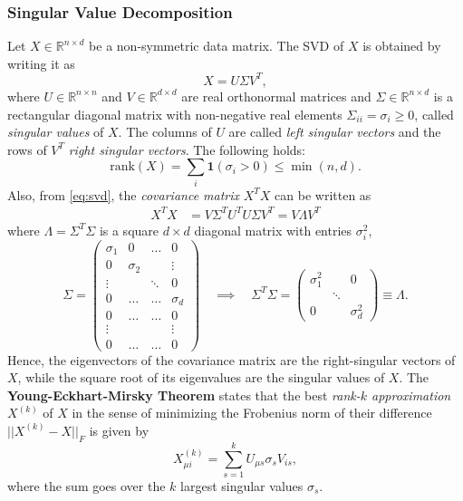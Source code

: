 \documentclass{article}
\begin{document}
\subsubsection*{Singular Value Decomposition}
Let $X \in \mathbb{R}^{n\times d}$ be a non-symmetric data matrix. The SVD of $X$ is obtained by writing it as
\begin{equation}
    X = U\Sigma V^T,
    \label{eq:svd}
\end{equation}
where $U\in \mathbb{R}^{n\times n}$ and $V\in \mathbb{R}^{d\times d}$ are real orthonormal matrices and $\Sigma \in \mathbb{R}^{n\times d}$ is a rectangular diagonal matrix with non-negative real elements $\Sigma_{ii} = \sigma_i \geq 0$, called \emph{singular values} of $X$. The columns of $U$ are called \emph{left singular vectors} and the rows of $V^T$ \emph{right singular vectors}. The following holds:
\begin{equation}
    \text{rank}(X) = \sum_{i} \mathbf{1}(\sigma_i > 0)
    \leq \min(n,d).
\end{equation}
Also, from \ref{eq:svd}, the \emph{covariance matrix} $X^TX$ can be written as
\begin{align}
    X^TX &=
    V\Sigma^T U^T U\Sigma V^T
    =
    V\Lambda V^T
\end{align}
where $\Lambda = \Sigma^T\Sigma$ is a square $d\times d$ diagonal matrix with entries $\sigma_i^2$,
\begin{equation}
    \Sigma =
    \begin{pmatrix}
        \sigma_1 & 0 & \ldots & 0 \\
        0 & \sigma_2 &  & \vdots \\
        \vdots & & \ddots & 0 \\
        0 &  \dots & \dots&   \sigma_d \\
        0 &  \dots & \dots&   0 \\
        \vdots & & &   \vdots \\
        0 &  \dots & \dots &   0
    \end{pmatrix}
    \quad \implies \quad
    \Sigma^T\Sigma =
    \begin{pmatrix}
        \sigma_1^2 &  & 0 \\
        & \ddots & \\
        0 & &\sigma_d^2
    \end{pmatrix}
    \equiv \Lambda.
\end{equation}
Hence, the eigenvectors of the covariance matrix are the right-singular vectors of $X$, while the square root of its eigenvalues are the singular values of $X$. The \textbf{Young-Eckhart-Mirsky Theorem} states that the best \emph{rank-$k$ approximation} $X^{(k)}$ of $X$ in the sense of minimizing the Frobenius norm of their difference
$ || X^{(k)} - X ||_F$ is given by
\begin{equation}
    X_{\mu i}^{(k)}
    =
    \sum_{s=1}^{k} U_{\mu s} \sigma_s V_{i s},
\end{equation}
where the sum goes over the $k$ largest singular values $\sigma_s$. 
\end{document}
